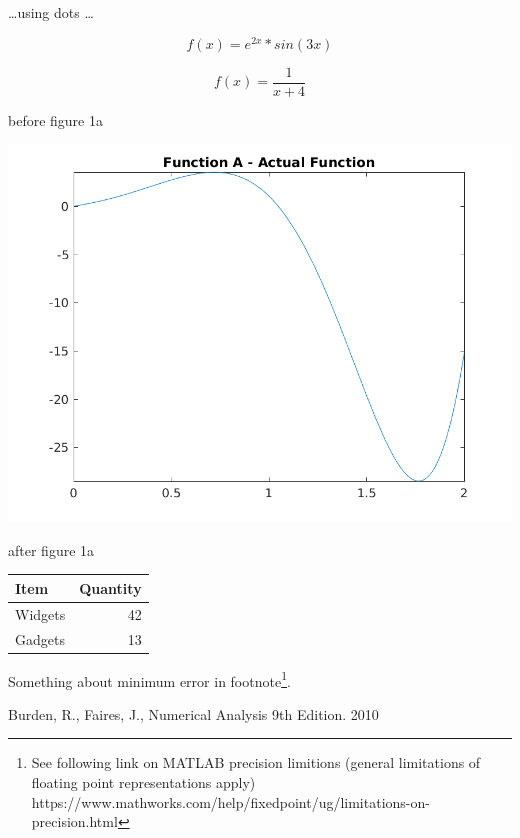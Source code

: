 \documentclass[a4paper]{article}
\begin{document}
\dots using dots \dots


\begin{equation}
f(x) = e^{2x} * sin(3x)
\label{eq:fa}
\end{equation}

\begin{equation}
f(x) = \frac{1}{x+4}
\label{eq:fb}
\end{equation}



before figure 1a
\begin{center}
	\includegraphics[width=1\textwidth]{../output/a_actual.png}
	\label{figa}
\end{center}
after figure 1a



\bgroup
\def\arraystretch{1.5}
\begin{center}
	\centering
	\begin{tabular}{l|r}
	\textbf{Item} & \textbf{Quantity} \\
	\hline
	Widgets & 42 \\
	Gadgets & 13
	\end{tabular}
	\label{table1}
\end{center}
\egroup




Something about minimum error in footnote\footnote{See following link on MATLAB precision limitions (general limitations of floating point representations apply) https://www.mathworks.com/help/fixedpoint/ug/limitations-on-precision.html}.




\newpage
\begin{thebibliography}{9}
  Burden, R., Faires, J., Numerical Analysis 9th Edition. 2010

\end{thebibliography}
\end{document}
